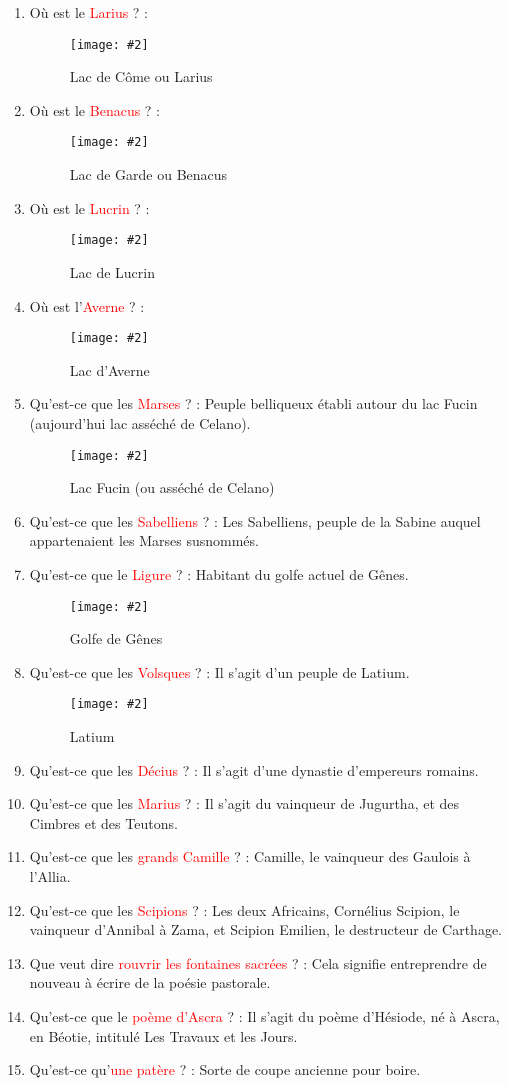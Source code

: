 \documentclass[a4paper, 11pt, hidelinks]{article}
\newcommand{\img}[4]{\begin{figure}[!ht]
    \centering
    \texttt{[image: \#2]}
    \caption{#3}
    \label{#4}
    \end{figure} }
\begin{document}
\begin{enumerate}
            \img{0.5}{Aconit.jpg}{Aconit}{78}
            \item Où est le \textcolor{red}{Larius} ? :
            \img{0.3}{Come.png}{Lac de Côme ou Larius}{80}
      \item Où est le \textcolor{red}{Benacus} ? :
            \img{0.3}{Garde.png}{Lac de Garde ou Benacus}{81}
            \item Où est le \textcolor{red}{Lucrin} ? :
            \img{0.3}{Lucrin.png}{Lac de Lucrin}{82}
      \item Où est l'\textcolor{red}{Averne} ? :
            \img{0.3}{Averne.png}{Lac d'Averne}{83}
      \item Qu'est-ce que les \textcolor{red}{Marses} ? : Peuple belliqueux établi autour du lac Fucin (aujourd'hui lac asséché de Celano).
            \img{0.3}{Celano.png}{Lac Fucin (ou asséché de Celano)}{84}
      \item Qu'est-ce que les \textcolor{red}{Sabelliens} ? : Les Sabelliens, peuple de la Sabine auquel appartenaient les Marses susnommés.
      \item Qu'est-ce que le \textcolor{red}{Ligure} ? : Habitant du golfe actuel de Gênes.
            \img{0.3}{Gênes.png}{Golfe de Gênes}{85}
            \item Qu'est-ce que les \textcolor{red}{Volsques} ? : Il s'agit d'un peuple de Latium.
            \img{0.3}{Latium.png}{Latium}{86}
      \item Qu'est-ce que les \textcolor{red}{Décius} ? : Il s'agit d'une dynastie d'empereurs romains.
      \item Qu'est-ce que les \textcolor{red}{Marius} ? : Il s'agit du vainqueur de Jugurtha, et des Cimbres et des Teutons.
      \item Qu'est-ce que les \textcolor{red}{grands Camille} ? : Camille, le vainqueur des Gaulois à l'Allia.
      \item Qu'est-ce que les \textcolor{red}{Scipions} ? : Les deux Africains, Cornélius Scipion, le vainqueur d'Annibal à Zama, et Scipion Emilien,
            le destructeur de Carthage.
            \item Que veut dire \textcolor{red}{rouvrir les fontaines sacrées} ? : Cela signifie entreprendre de nouveau à écrire de la poésie pastorale.
            \item Qu'est-ce que le \textcolor{red}{poème d'Ascra} ? : Il s'agit du poème d'Hésiode, né à Ascra, en Béotie, intitulé Les Travaux et les Jours.
            \item Qu'est-ce qu'\textcolor{red}{une patère} ? : Sorte de coupe ancienne pour boire.

\end{enumerate}
\end{document}
